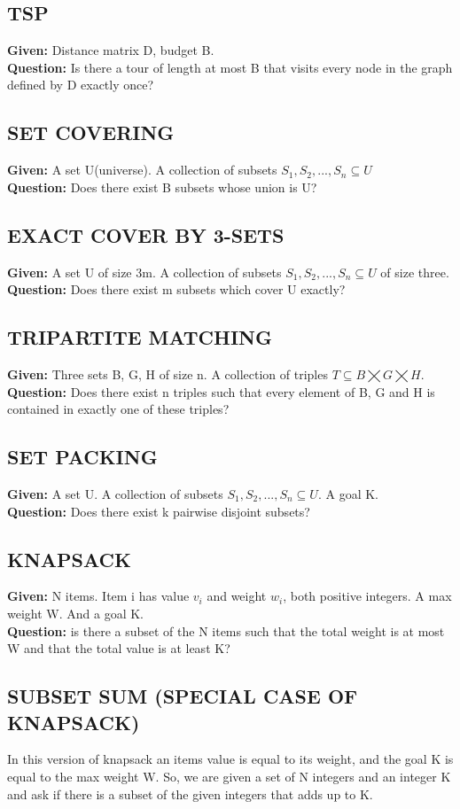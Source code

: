 \subsection{TSP}
\textbf{Given:} Distance matrix D, budget B. \\
\textbf{Question:} Is there a tour of length at most B that visits every node in the graph defined by D exactly once?\\
\subsection{SET COVERING}
\textbf{Given:} 
A set U(universe). A collection of subsets $S_1,S_2,...,S_n \subseteq U$\\
\textbf{Question:} Does there exist B subsets whose union is U?
\subsection{EXACT COVER BY 3-SETS}
\textbf{Given:} 
A set U of size 3m. A collection of subsets $S_1,S_2,...,S_n \subseteq U$ of size three.\\
\textbf{Question:} Does there exist m subsets which cover U exactly? 
\subsection{TRIPARTITE MATCHING}
\textbf{Given:} 
Three sets B, G, H of size n. A collection of triples $T \subseteq B \bigtimes G \bigtimes H.$\\
\textbf{Question:} Does there exist n triples such that every element of B, G and H is contained in exactly one of these triples?
\subsection{SET PACKING}
\textbf{Given:} 
A set U. A collection of subsets $S_1,S_2,...,S_n \subseteq U$. A goal K.\\
\textbf{Question:} Does there exist k pairwise disjoint subsets?
\subsection{KNAPSACK}
\textbf{Given:} 
N items. Item i has value $v_i$ and weight $w_i$, both positive integers. A max weight W. And a goal K. \\
\textbf{Question:} is there a subset of the N items such that the total weight is at most W and that the total value is at least K?
\subsection{SUBSET SUM (SPECIAL CASE OF KNAPSACK)}
In this version of knapsack an items value is equal to its weight, and the goal K is equal to the max weight W. So, we are given a set of N integers and an integer K and ask if there is a subset of the given integers that adds up to K.
